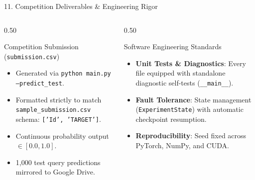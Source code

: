 \documentclass[aspectratio=169, 10pt]{beamer}
\begin{document}
\begin{frame}{11. Competition Deliverables \& Engineering Rigor}
    \begin{columns}[T]
        \begin{column}{0.50\textwidth}
            \begin{block}{Competition Submission (\texttt{submission.csv})}
                \begin{itemize}
                    \item Generated via \texttt{python main.py --predict\_test}.
                    \item Formatted strictly to match \texttt{sample\_submission.csv} schema: \texttt{['Id', 'TARGET']}.
                    \item Continuous probability output $\in [0.0, 1.0]$.
                    \item 1,000 test query predictions mirrored to Google Drive.
                \end{itemize}
            \end{block}
        \end{column}
        \begin{column}{0.50\textwidth}
            \begin{block}{Software Engineering Standards}
                \begin{itemize}
                    \item \textbf{Unit Tests \& Diagnostics}: Every file equipped with standalone diagnostic self-tests (\texttt{\_\_main\_\_}).
                    \item \textbf{Fault Tolerance}: State management (\texttt{ExperimentState}) with automatic checkpoint resumption.
                    \item \textbf{Reproducibility}: Seed fixed across PyTorch, NumPy, and CUDA.
                \end{itemize}
            \end{block}
        \end{column}
    \end{columns}
\end{frame}
\end{document}

